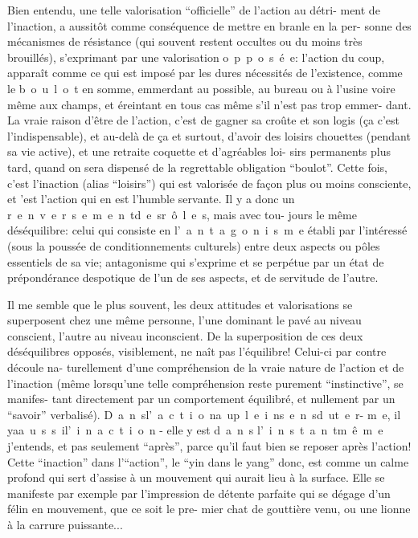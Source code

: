 Bien entendu, une telle valorisation ``officielle'' de l'action au détri-
ment de l'inaction, a aussitôt comme conséquence de mettre en branle en la per-
sonne des mécanismes de résistance (qui souvent restent occultes ou du moins
très brouillés), s'exprimant par une valorisation \mbox{o p p o s é e}: l'action\inserted{,} du
coup, apparaît comme ce qui est imposé par les dures nécessités de l'existence,
comme le \mbox{b o u l o t} en somme, emmerdant au possible, au bureau ou à l'usine
voire même aux champs, et éreintant en tous cas même s'il n'est pas trop emmer-
dant. La vraie raison d'être de l'action, c'est de gagner sa croûte et son logis
(ça c'est l'indispensable), et au-delà de ça et surtout, d'avoir des loisirs
chouettes (pendant sa vie active), et une retraite coquette et d'agréables loi-
sirs permanents plus tard, quand on sera dispensé de la regrettable obligation
``boulot''. Cette fois, c'est l'inaction (alias ``loisirs'') qui est valorisée de
façon plus ou moins consciente, et 'est l'action qui en est l'humble servante.
Il y a donc un \mbox{r e n v e r s e m e n t\quad d e s\quad r ô l e s}, mais avec tou-
jours le même déséquilibre: celui qui consiste en \mbox{l' a n t a g o n i s m e}
établi par l'intéressé (sous la poussée de conditionnements culturels) entre
deux aspects ou pôles essentiels de sa vie; antagonisme qui s'exprime et se
perpétue par un état de prépondérance despotique de l'un de ses aspects, et de
servitude de l'autre.

Il me semble que le plus souvent, les deux attitudes et valorisations se
superposent chez une même personne, l'une dominant le pavé au niveau conscient,
l'autre au niveau inconscient. De la superposition de ces deux déséquilibres
opposés, visiblement, ne naît pas l'équilibre! Celui-ci par contre découle na-
turellement d'une compréhension de la vraie nature de l'action et de l'inaction
(même lorsqu'une telle compréhension reste purement ``instinctive'', se manifes-
tant directement par un comportement équilibré, et nullement par un ``savoir''
verbalisé). \mbox{D a n s\quad l' a c t i o n\quad a u\quad p l e i n\quad s e n s\quad d u\quad t e r-}
\mbox{m e}, il \mbox{y\quad a\quad a u s s i\quad l' i n a c t i o n} - elle y est \mbox{d a n s}
\mbox{l' i n s t a n t\quad m ê m e} j'entends, et pas seulement ``après'', parce qu'il
faut bien se reposer après l'action! Cette ``inaction'' dans l'``action'', le ``yin
dans le yang'' donc, est comme un calme profond qui sert d'assise à un mouvement
qui aurait lieu à la surface. Elle se manifeste par exemple par l'impression
de détente parfaite qui se dégage d'un félin en mouvement, que ce soit le pre-
mier chat de gouttière venu, ou une lionne à la carrure puissante...

